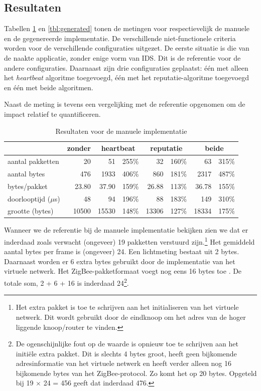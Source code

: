 \vspace{-3mm}

\subsection{Resultaten}

Tabellen \ref{tbl:manual} en \ref{tbl:generated} tonen de metingen voor
respectievelijk de manuele en de gegenereerde implementatie. De verschillende
niet-functionele criteria worden voor de verschillende configuraties uitgezet.
De eerste situatie is die van de naakte applicatie, zonder enige vorm van IDS.
Dit is de referentie voor de andere configuraties. Daarnaast zijn drie
configuraties geplaatst: \'e\'en met alleen het \emph{heartbeat} algoritme
toegevoegd, \'e\'en met het reputatie-algoritme toegevoegd en \'e\'en met beide
algoritmen.

Naast de meting is tevens een vergelijking met de referentie opgenomen om de
impact relatief te quantificeren.

\begin{table}[H]
  \centering
  \begin{tabular}{l|r|rr|rr|rr}
  \hline
      & zonder & \multicolumn{2}{c|}{heartbeat} & \multicolumn{2}{c|}{reputatie} & \multicolumn{2}{c}{beide} \\
  \hline
  \hline

aantal pakketten      &    20    &    51    & 255\% &    32    & 160\% &    63    & 315\% \\
aantal bytes          &   476    &  1933    & 406\% &   860    & 181\% &  2317    & 487\% \\
bytes/pakket          &    23.80 &    37.90 & 159\% &    26.88 & 113\% &    36.78 & 155\% \\
doorlooptijd ($\mu$s) &    48    &    94    & 196\% &    88    & 183\% &   149    & 310\% \\
grootte (bytes)       & 10500    & 15530    & 148\% & 13306    & 127\% & 18334    & 175\% \\

  \hline
  \end{tabular}
  \caption{Resultaten voor de manuele implementatie}
  \label{tbl:manual}
\end{table}

Wanneer we de referentie bij de manuele implementatie bekijken zien we dat er
inderdaad zoals verwacht (ongeveer) 19 pakketten verstuurd zijn.\footnote{Het
extra pakket is toe te schrijven aan het initialiseren van het virtuele
netwerk. Dit wordt gebruikt door de eindknoop om het adres van de hoger
liggende knoop/router te vinden.} Het gemiddeld aantal bytes per frame is
(ongeveer) 24. Een lichtmeting bestaat uit 2 bytes. Daarnaast worden er 6 extra
bytes gebruikt door de implementatie van het virtuele netwerk. Het
ZigBee-pakketformaat voegt nog eens 16 bytes toe \citep{alliance2012zigbee}. De
totale som, 2 + 6 + 16 is inderdaad 24\footnote{De ogenschijnlijke fout op de
waarde is opnieuw toe te schrijven aan het initi\"ele extra pakket. Dit is
slechts 4 bytes groot, heeft geen bijkomende adresinformatie van het virtuele
netwerk en heeft verder alleen nog 16 bijkomende bytes van het ZigBee-protocol.
Zo komt het op 20 bytes. Opgeteld bij 19 $\times$ 24 = 456 geeft dat inderdaad
476.}.

